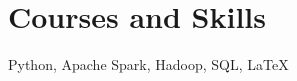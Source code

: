\documentclass[11pt,a4paper,roman]{moderncv} %
\begin{document}

\section{Courses and Skills}
{\small
{Python, Apache Spark, Hadoop, SQL, LaTeX}}
%
%
%
%
%
%
%
\end{document}
